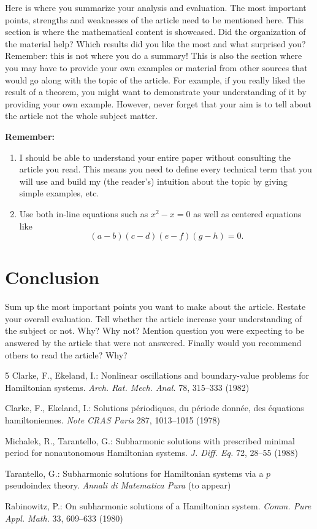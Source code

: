 \documentclass{article}
\begin{document}
Here is where you summarize your analysis and evaluation. The most important points, strengths and weaknesses of the article need to be mentioned here. This section is where the mathematical content is showcased. Did the organization of the material help? Which results did you like the most and what surprised you? Remember: this is not where you do a summary! This is also the section where you may have to provide your own examples or material from other sources that would go along with the topic of the article. For example, if you really liked the result of a theorem, you might want to demonstrate your understanding of it by providing your own example. However, never forget that your aim is to tell about the article not the whole subject matter.

\textbf{Remember:} 

\begin{enumerate}
\item I should be able to understand your entire paper without consulting the article you read. This means you need to define every technical term that you will use and build my (the reader's) intuition about the topic by giving simple examples, etc.
\item Use both in-line equations such as $x^2-x=0$ as well as centered equations like
$$(a-b)(c-d)(e-f)(g-h)=0.$$
\end{enumerate}

\section{Conclusion}

Sum up the most important points you want to make about the article. Restate your overall evaluation. Tell whether the article increase your understanding of the subject or not. Why? Why not? Mention question you were expecting to be answered by the article that were not answered. Finally would you recommend others to read the article? Why?




%
%
\begin{thebibliography}{5}
%
Clarke, F., Ekeland, I.:
Nonlinear oscillations and
boundary-value problems for Hamiltonian systems.
{\it Arch. Rat. Mech. Anal.} 78, 315--333 (1982)

Clarke, F., Ekeland, I.:
Solutions p\'{e}riodiques, du
p\'{e}riode donn\'{e}e, des \'{e}quations hamiltoniennes.
{\it Note CRAS Paris} 287, 1013--1015 (1978)

Michalek, R., Tarantello, G.:
Subharmonic solutions with prescribed minimal
period for nonautonomous Hamiltonian systems.
{\it J. Diff. Eq.} 72, 28--55 (1988)

Tarantello, G.:
Subharmonic solutions for Hamiltonian
systems via a ${p}$ pseudoindex theory.
{\it Annali di Matematica Pura} (to appear)

Rabinowitz, P.:
On subharmonic solutions of a Hamiltonian system.
{\it Comm. Pure Appl. Math.} 33, 609--633 (1980)

\end{thebibliography}
\end{document}
